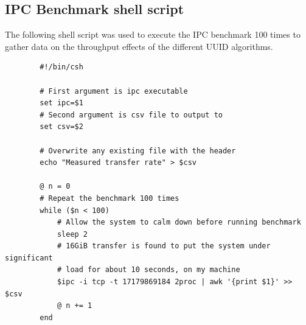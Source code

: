 \documentclass[a4paper,12pt,twoside,openright]{report}
\begin{document}
	\begin{appendices}
		\chapter{IPC Benchmark shell script}
		\label{appendix:IPC}
		
		The following shell script was used to execute the IPC benchmark 100 times to gather data on the throughput effects of the different UUID algorithms.
		
		\begin{verbatim}
		#!/bin/csh
		
		# First argument is ipc executable
		set ipc=$1
		# Second argument is csv file to output to
		set csv=$2
		
		# Overwrite any existing file with the header
		echo "Measured transfer rate" > $csv
		
		@ n = 0
		# Repeat the benchmark 100 times
		while ($n < 100)
		    # Allow the system to calm down before running benchmark
		    sleep 2
		    # 16GiB transfer is found to put the system under significant
		    # load for about 10 seconds, on my machine
		    $ipc -i tcp -t 17179869184 2proc | awk '{print $1}' >> $csv
		    @ n += 1
		end
		\end{verbatim}
	\end{appendices}
	
	
	
	
	
	
\end{document}
